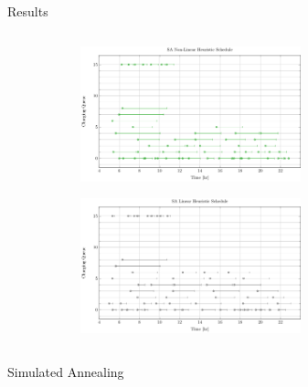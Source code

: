 \documentclass[aspectratio=169,dvipsnames]{beamer}
\begin{document}
\begin{frame}[label={sec:org286c646}]{Results}
\begin{columns}
\begin{column}{0.5\columnwidth}
\begin{figure}
\begin{subfigure}[t]{\textwidth}
\centering
    \includegraphics[width=0.7\textwidth]{img/sa-nonlinear/schedule-sa-nonlinear}
\end{subfigure}
\begin{subfigure}[t]{\textwidth}
\centering
    \includegraphics[width=0.7\textwidth]{img/sa-nonlinear/schedule-sa-heuristic}
\end{subfigure}
\end{figure}
\end{column}
\end{columns}
\end{frame}


\begin{frame}[label={sec:org1e4373f}]{}
\centering
\Huge Simulated Annealing
\end{frame}
\end{document}
